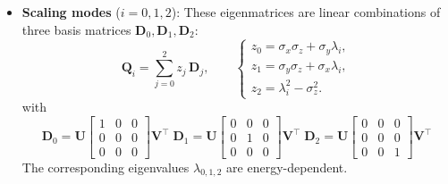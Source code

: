 \documentclass{article}
\begin{document}
\begin{itemize}
\item \textbf{Scaling modes} ($i = 0,1,2$):
These eigenmatrices are linear combinations of three basis matrices
$\mathbf{D}_0, \mathbf{D}_1, \mathbf{D}_2$:
\begin{equation*}
    \mathbf{Q}_i = \sum_{j=0}^{2} z_j\,\mathbf{D}_j,
    \qquad
    \begin{cases}
        z_0 = \sigma_x\sigma_z + \sigma_y\lambda_i, \\[0.5ex]
        z_1 = \sigma_y\sigma_z + \sigma_x\lambda_i, \\[0.5ex]
        z_2 = \lambda_i^2 - \sigma_z^2.
    \end{cases}
\end{equation*}
with
\begin{equation*}
    \mathbf{D}_0 = \mathbf{U}
    \begin{bmatrix}
        1 & 0 & 0 \\
        0 & 0 & 0 \\
        0 & 0 & 0
    \end{bmatrix}\mathbf{V}^\top\; 
    \mathbf{D}_1 = \mathbf{U}
    \begin{bmatrix}
        0 & 0 & 0 \\
        0 & 1 & 0 \\
        0 & 0 & 0
    \end{bmatrix}\mathbf{V}^\top\; 
    \mathbf{D}_2 = \mathbf{U}
    \begin{bmatrix}
        0 & 0 & 0 \\
        0 & 0 & 0 \\
        0 & 0 & 1
    \end{bmatrix}\mathbf{V}^\top
\end{equation*}
The corresponding eigenvalues $\lambda_{0,1,2}$ are energy-dependent.


\end{itemize}
\end{document}

